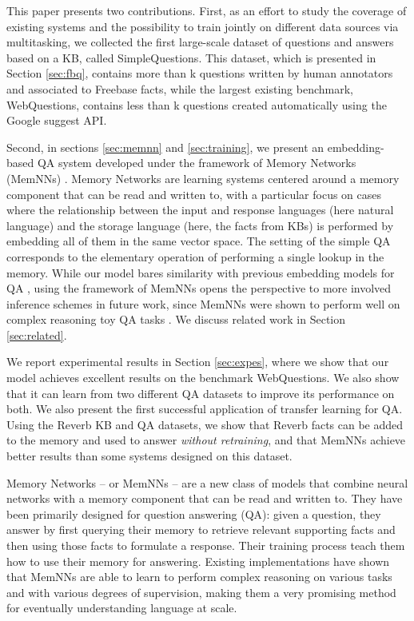 \documentclass[11pt,a4paper]{article}
\newcommand{\fb}{{\sf Freebase}\xspace}
\newcommand{\wq}{{\sf WebQuestions}\xspace}
\newcommand{\rv}{{\sf Reverb}\xspace}
\newcommand{\fbq}{{\sf SimpleQuestions}\xspace}
\begin{document}
This paper presents two contributions. First, as an effort to study
the coverage of existing systems and the possibility to train jointly
on different data sources via multitasking, we collected the first
large-scale dataset of questions and answers based on a KB, called
\fbq. This dataset, which is presented in Section \ref{sec:fbq},
contains more than k questions written by human annotators and
associated to \fb facts, while the largest existing benchmark, \wq,
contains less than k questions created automatically using the
Google suggest API.

Second, in sections \ref{sec:memnn} and \ref{sec:training}, we present
an embedding-based QA system developed under the framework of Memory
Networks (MemNNs) \cite{weston2014memory,sukhbaatar2015weakly}. Memory
Networks are learning systems centered around a memory component that
can be read and written to, with a particular focus on cases where the
relationship between the input and response languages (here natural
language) and the storage language (here, the facts from KBs) is
performed by embedding all of them in the same vector space. The
setting of the simple QA corresponds to the elementary operation of
performing a single lookup in the memory. While our model bares
similarity with previous embedding models for QA
\cite{bordes2014open,bordes-chopra-weston:2014:EMNLP2014}, using the
framework of MemNNs opens the perspective to more involved inference
schemes in future work, since MemNNs were shown to perform well on
complex reasoning toy QA tasks \cite{weston2014memory}. We discuss
related work in Section \ref{sec:related}.

We report experimental results in Section \ref{sec:expes},
where we show that our model achieves excellent results on the
benchmark \wq. We also show that it can learn from two different QA
datasets to improve its performance on both. We also present the first
successful application of transfer learning for QA. Using the \rv KB
and QA datasets, we show that \rv facts can be added to the memory and
used to answer {\it without retraining}, and that MemNNs achieve
better results than some systems designed on this dataset.


Memory Networks \cite{weston2014memory} -- or MemNNs -- are a new class of models that
combine neural networks with a memory component that can be
read and written to.
They have been primarily designed for question answering (QA): given a
question, they answer by first querying their memory to retrieve
relevant supporting facts and then using those facts to formulate a response.
Their training process teach them how to use their memory for answering.
Existing implementations
\cite{weston2014memory,weston2015towards,sukhbaatar2015weakly} have
shown that MemNNs are able to learn to perform complex reasoning on
various tasks and with various degrees of supervision, making them a
very promising method for eventually understanding language at scale.
\end{document}
